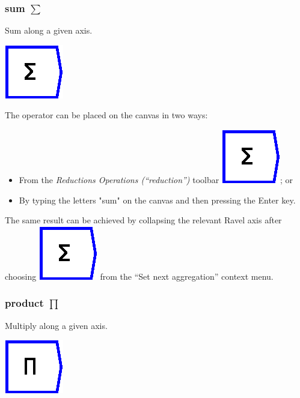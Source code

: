 \subsubsection{sum $\sum$}

\label{Operation:sum} Sum along a given axis.

\includegraphics{images/sum}

The operator can be placed on the canvas in two ways:
\begin{itemize}
\item From the \emph{Reductions Operations (``reduction'')} toolbar \includegraphics{images/sum};
or 
\item By typing the letters "sum" on the canvas and then pressing the
Enter key.
\end{itemize}
The same result can be achieved by collapsing the relevant Ravel axis
after choosing \includegraphics{images/sum} from the ``Set next
aggregation'' context menu.

\subsubsection{product $\prod$}

\label{Operation:product} Multiply along a given axis.

\includegraphics{images/product}


